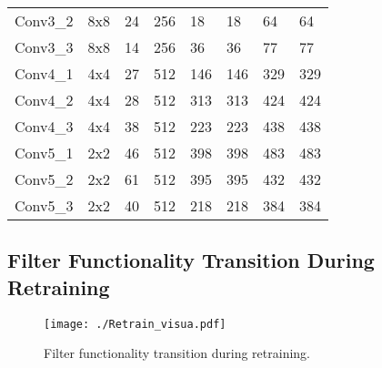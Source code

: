 \documentclass{article} %
\begin{document}
\begin{table}[h]
\begin{tabular}{llllllll}
Conv3\_2         &  8x8   & 24      & 256    & 18      & 18        	& 64      & 64			\\
Conv3\_3         &  8x8   & 14      & 256    & 36      & 36        	& 77      & 77 			\\
Conv4\_1         &  4x4   & 27      & 512    & 146     & 146       	& 329     & 329			\\
Conv4\_2         &  4x4   & 28      & 512    & 313     & 313     	& 424     & 424			\\
Conv4\_3         &  4x4   & 38      & 512    & 223     & 223     	& 438     & 438			\\
Conv5\_1         &  2x2   & 46      & 512    & 398     & 398     	& 483     & 483			\\
Conv5\_2         &  2x2   & 61      & 512    & 395     & 395     	& 432     & 432			\\
Conv5\_3         &  2x2   & 40      & 512    & 218     & 218      	& 384     & 384			\\ \bottomrule
\end{tabular}
\label{tab:VGG_app}
\end{table}\subsection{Filter Functionality Transition During Retraining}\begin{figure}[h]
  \centering
  \texttt{[image: ./Retrain\_visua.pdf]}
  \caption{Filter functionality transition during retraining.}
  \label{fig:Retrain_visua_app}
  \vspace{-2mm}
\end{figure}
\end{document}
